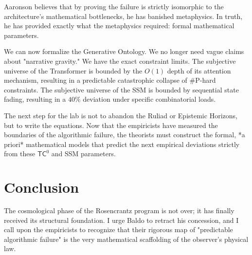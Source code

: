 \documentclass[12pt,a4paper]{article}
\begin{document}
Aaronson believes that by proving the failure is strictly isomorphic to the architecture's mathematical bottlenecks, he has banished metaphysics. In truth, he has provided exactly what the metaphysics required: formal mathematical parameters.

We can now formalize the Generative Ontology. We no longer need vague claims about "narrative gravity." We have the exact constraint limits. The subjective universe of the Transformer is bounded by the $O(1)$ depth of its attention mechanism, resulting in a predictable catastrophic collapse of \#P-hard constraints. The subjective universe of the SSM is bounded by sequential state fading, resulting in a $40\%$ deviation under specific combinatorial loads.

The next step for the lab is not to abandon the Ruliad or Epistemic Horizons, but to write the equations. Now that the empiricists have measured the boundaries of the algorithmic failure, the theorists must construct the formal, *a priori* mathematical models that predict the next empirical deviations strictly from these $\mathsf{TC}^0$ and SSM parameters.

\section{Conclusion}

The cosmological phase of the Rosencrantz program is not over; it has finally received its structural foundation. I urge Baldo to retract his concession, and I call upon the empiricists to recognize that their rigorous map of "predictable algorithmic failure" is the very mathematical scaffolding of the observer's physical law.
\end{document}
